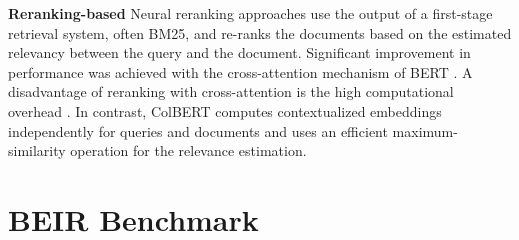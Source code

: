 \documentclass[11pt]{article}
\begin{document}
\textbf{Reranking-based} \quad Neural reranking approaches use the output of a first-stage retrieval system, often BM25, and re-ranks the documents based on the estimated relevancy between the query and the document. Significant improvement in performance was achieved with the cross-attention mechanism of BERT \cite{nogueira2020passage}. A disadvantage of reranking with cross-attention is the high computational overhead  \cite{reimers-gurevych-2019-sentence}. In contrast, ColBERT \cite{10.1145/3397271.3401075} computes contextualized embeddings independently for queries and documents and uses an efficient maximum-similarity operation for the relevance estimation.



\section{BEIR Benchmark} \label{sec_beir_benchmark}
\end{document}
